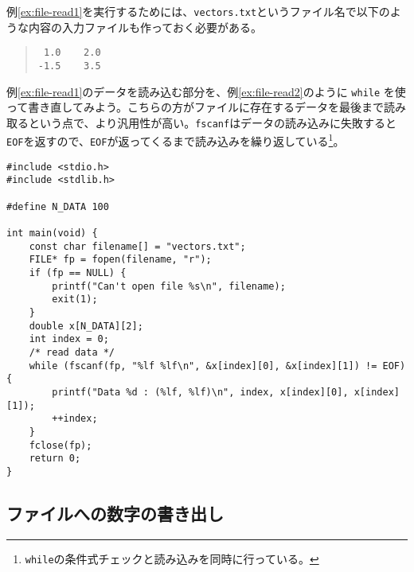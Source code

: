 例\ref{ex:file-read1}を実行するためには、\texttt{vectors.txt}というファイル名で以下のような内容の入力ファイルも作っておく必要がある。
\begin{quote}
    \begin{verbatim}
 1.0    2.0
-1.5    3.5
\end{verbatim}
\end{quote}
例\ref{ex:file-read1}のデータを読み込む部分を、例\ref{ex:file-read2}のように \texttt{while} を使って書き直してみよう。こちらの方がファイルに存在するデータを最後まで読み取るという点で、より汎用性が高い。\texttt{fscanf}はデータの読み込みに失敗すると\texttt{EOF}を返すので、\texttt{EOF}が返ってくるまで読み込みを繰り返している\footnote{\texttt{while}の条件式チェックと読み込みを同時に行っている。}。
\begin{reidai}\label{ex:file-read2}
    \begin{verbatim}
#include <stdio.h>
#include <stdlib.h>

#define N_DATA 100

int main(void) {
    const char filename[] = "vectors.txt";
    FILE* fp = fopen(filename, "r");
    if (fp == NULL) {
        printf("Can't open file %s\n", filename);
        exit(1);
    }
    double x[N_DATA][2];
    int index = 0;
    /* read data */
    while (fscanf(fp, "%lf %lf\n", &x[index][0], &x[index][1]) != EOF) {
        printf("Data %d : (%lf, %lf)\n", index, x[index][0], x[index][1]);
        ++index;
    }
    fclose(fp);
    return 0;
}
\end{verbatim}
\end{reidai}

\subsection{ファイルへの数字の書き出し}

